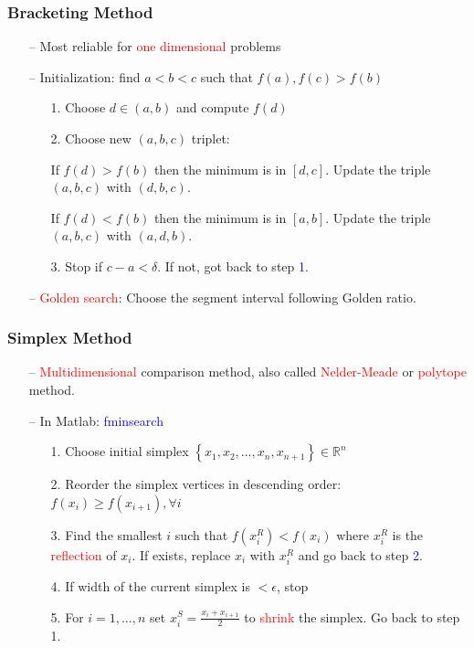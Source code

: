 \documentclass[aspectratio=169, 11pt]{beamer}
\begin{document}
\begin{frame}
\frametitle{Bracketing Method}
  \begin{itemize}
    \item[--] Most reliable for \textcolor{red}{one dimensional} problems
    \bigskip
    \item[--] Initialization: find $a<b<c$ such that $f(a), f(c) > f(b)$
    \begin{itemize}
      \item[1.] Choose $d\in\left(a,b\right)$ and compute $f(d)$
      \medskip
      \item[2.] Choose new $(a,b,c)$ triplet:

      If $f(d)>f(b)$ then the minimum is in $\left[d,c\right]$. Update the triple $(a,b,c)$ with $(d,b,c)$.

      If $f(d)<f(b)$ then the minimum is in $\left[a,b\right]$. Update the triple $(a,b,c)$ with $(a,d,b)$.

      \medskip
      \item[3.] Stop if $c-a<\delta$. If not, got back to step \textcolor{blue}{1.}
    \end{itemize}
    \bigskip
    \item[--] \textcolor{red}{Golden search}: Choose the segment interval following Golden ratio.
  \end{itemize}
\end{frame}

\begin{frame}
\frametitle{Simplex Method}
  \begin{itemize}
    \item[--] \textcolor{red}{Multidimensional} comparison method, also called \textcolor{red}{Nelder-Meade} or \textcolor{red}{polytope} method.
    \item[--] In Matlab: \textcolor{blue}{fminsearch}
    \begin{itemize}
      \medskip
      \item[1.] Choose initial simplex $\left\{ x_{1},x_{2},\ldots,x_{n},x_{n+1}\right\} \in\mathbb{R}^{n}$
      \medskip
      \item[2.] Reorder the simplex vertices in descending order: $f\left(x_{i}\right)\geqslant f\left(x_{i+1}\right),\forall i$
      \medskip
      \item[3.] Find the smallest $i$ such that $f\left(x_{i}^{R}\right)<f\left(x_{i}\right)$ where $x_{i}^{R}$ is the \textcolor{red}{reflection} of $x_{i}$. If exists, replace $x_{i}$ with $x_{i}^{R}$ and go back to step \textcolor{blue}{2}.
      \medskip
      \item[4.] If width of the current simplex is $<\epsilon$, stop
      \medskip
      \item[5.] For $i=1,\ldots,n$ set $x_{i}^{S}=\frac{x_{i}+x_{i+1}}{2}$ to \textcolor{red}{shrink} the simplex. Go back to step 1.
    \end{itemize}
  \end{itemize}
\end{frame}
\end{document}
